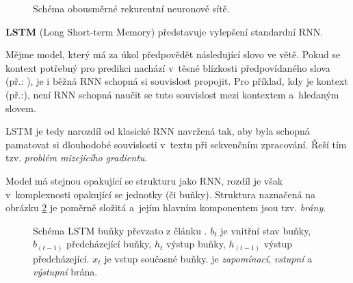 \begin{figure}[hbt]
    \centering
	\caption{Schéma obousměrné rekurentní neuronové sítě.}
	\label{bidirRNN}
\end{figure}

\pagebreak\textbf{LSTM} (Long Short-term Memory) představuje vylepšení standardní RNN.\par \smallskip
Mějme model, který má za úkol předpovědět následující slovo ve větě. Pokud se kontext potřebný pro predikci nachází v~těsné blízkosti předpovídaného slova (př.: ), je i běžná RNN schopná si souvislost propojit. Pro příklad, kdy je kontext  (př.:), není RNN schopná naučit se tuto souvislost mezi kontextem a~hledaným slovem.\par \smallskip
LSTM je tedy narozdíl od klasické RNN navržená tak, aby byla schopná pamatovat si dlouhodobé souvislosti v~textu při sekvenčním zpracování. Řeší tím tzv. \emph{problém mizejícího gradientu}.\par
Model má stejnou opakující se strukturu jako RNN, rozdíl je však v~komplexnosti opakující se jednotky (či buňky). Struktura naznačená na obrázku \ref{lstm_cell} je poměrně složitá a~jejím hlavním komponentem jsou tzv. \emph{brány}. 

\begin{figure}[hbt]
    \centering
	\caption{Schéma LSTM buňky převzato z článku \cite{understandingLSTM}. $b_t$ je vnitřní stav buňky, $b_{(t-1)}$ předcházející buňky, $h_t$ výstup buňky, $h_{(t-1)}$ výstup předcházející. $x_t$ je vstup současné buňky.  je \emph{zapomínací},  \emph{vstupní} a  \emph{výstupní} brána.}
	\label{lstm_cell}
\end{figure}

